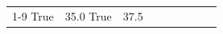\begin{table}[H]
\begin{tabular}{lllrlllll}
\cline{1-9}
True & 35.0%
\cline{1-9}
True & 37.5%

\end{tabular}
\end{table}
